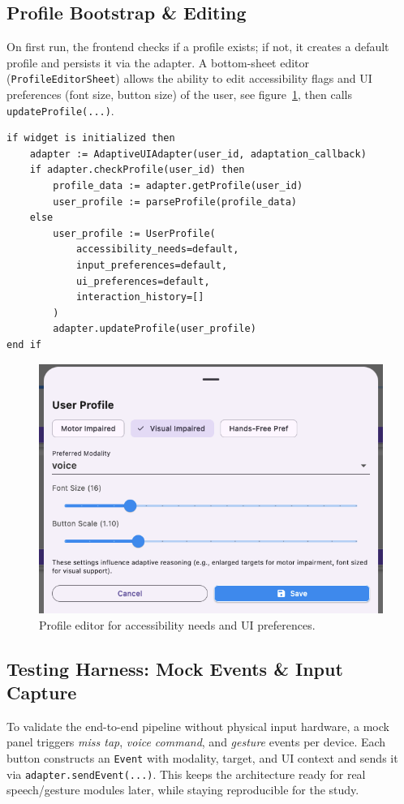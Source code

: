 \subsection{Profile Bootstrap \& Editing}
On first run, the frontend checks if a profile exists; if not, it creates a default profile and persists it via the adapter. A bottom-sheet editor (\texttt{ProfileEditorSheet}) allows the ability to edit accessibility flags and UI preferences (font size, button size) of the user, see figure~\ref{fig:fig_profile_editor}, then calls \texttt{updateProfile(...)}.

\begin{lstlisting}[basicstyle=\ttfamily\small, caption={Profile initialization logic}]
if widget is initialized then
    adapter := AdaptiveUIAdapter(user_id, adaptation_callback)
    if adapter.checkProfile(user_id) then
        profile_data := adapter.getProfile(user_id)
        user_profile := parseProfile(profile_data)
    else
        user_profile := UserProfile(
            accessibility_needs=default,
            input_preferences=default,
            ui_preferences=default,
            interaction_history=[]
        )
        adapter.updateProfile(user_profile)
end if
\end{lstlisting}

\begin{figure}[H]
\centering
\includegraphics[width=.6\linewidth]{images/fig_profile_editor.png}
\caption{Profile editor for accessibility needs and UI preferences.}
\label{fig:fig_profile_editor}
\end{figure}

\subsection{Testing Harness: Mock Events \& Input Capture}
To validate the end-to-end pipeline without physical input hardware, a mock panel triggers \emph{miss tap}, \emph{voice command}, and \emph{gesture} events per device. Each button constructs an \texttt{Event} with modality, target, and UI context and sends it via \texttt{adapter.sendEvent(...)}. This keeps the architecture ready for real speech/gesture modules later, while staying reproducible for the study.

